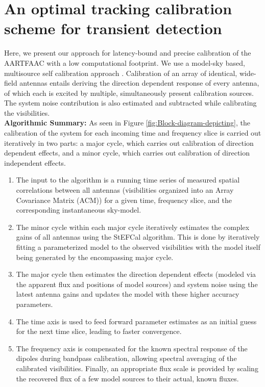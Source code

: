 \documentclass[referee]{aa}
\begin{document}
\section{\label{sec:An-Optimal,-tracking}An optimal tracking calibration
scheme for transient detection}

Here,  we present our  approach for  latency-bound and  precise calibration  of the
AARTFAAC  with  a  low  computational  footprint.  We  use  a  model-sky  based,
multisource   self   calibration   approach   \citep{wijnholds2009multisource}.
Calibration of an  array of identical, wide-field antennas  entails deriving the
direction  dependent response  of every  antenna, of which each is  excited by
multiple,  simultaneously   present  calibration  sources.    The  system  noise
contribution   is  also   estimated  and   subtracted  while   calibrating  the
visibilities.\\    \textbf{Algorithmic    Summary:}    As   seen    in    Figure
\ref{fig:Block-diagram-depicting},  the  calibration  of  the  system  for  each
incoming time  and frequency slice  is carried out  iteratively in two  parts: a
major cycle, which carries out  calibration of direction dependent effects, and a
minor cycle, which carries out calibration of direction independent effects.
\begin {enumerate}
\item {The  input to the algorithm  is a running time series  of measured spatial
  correlations  between  all  antennas  (visibilities organized  into  an  Array
  Covariance  Matrix  (ACM)) for  a  given time, frequency  slice, and  the
  corresponding instantaneous sky-model.}
\item {The minor cycle within each major cycle iteratively estimates the complex
  gains        of       all        antennas       using        the       StEFCal
  \citep{salvini2014stef,salvini2014stefursi}   algorithm.   This  is   done  by
  iteratively fitting  a parameterized model to the  observed visibilities with
  the model itself being generated by the encompassing major cycle.}
\item {The major  cycle then estimates the direction  dependent effects (modeled
  via the apparent  flux and positions of model sources)  and system noise using
  the latest  antenna gains and updates the  model with these  higher accuracy
  parameters.}
\item {The time  axis is used to feed forward parameter  estimates as an initial
  guess for the next time slice, leading to faster convergence.}
\item {The frequency axis is compensated  for the known spectral response of the
  dipoles  during  bandpass  calibration,  allowing spectral  averaging  of  the
  calibrated  visibilities. Finally, an  appropriate flux  scale is  provided by
  scaling  the recovered  flux of  a few  model sources  to their  actual, known
  fluxes.}
\end{enumerate}
\end{document}
